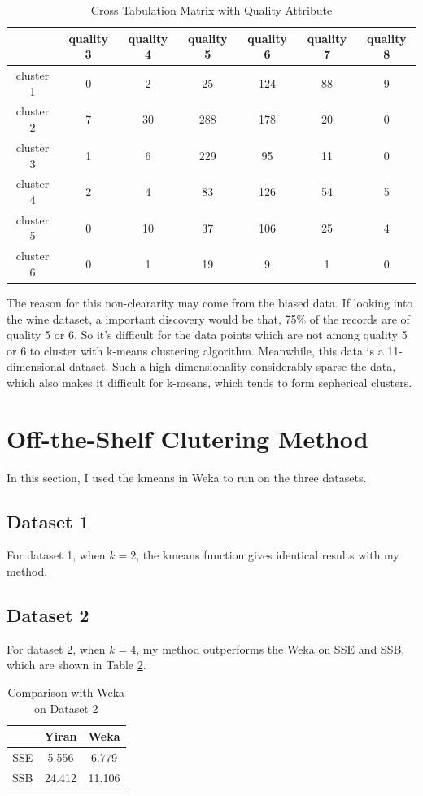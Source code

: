 \documentclass{article}
\begin{document}
		\begin{table}
		\centering
			\begin{tabular}{|c|c|c|c|c|c|c|}
			\hline
			&	quality 3&	quality 4	&quality 5	&quality 6&	quality 7&	quality 8\\
			\hline
			cluster 1&	0&	2	&25	&124	&88&	9\\
			\hline
			cluster 2&	7&	30&	288	&178	&20&	0\\
			\hline
			cluster 3&	1&	6	&229 &	95	&11&	0\\
			\hline
			cluster 4&	2&	4	&83	&126	&54&	5\\
			\hline
			cluster 5&	0&	10&	37	&106	&25&	4\\
			\hline
			cluster 6&	0&	1	&19	&9&	1&	0 \\
			\hline
			\end{tabular}
			\caption{Cross Tabulation Matrix with Quality Attribute}
			\label{tbl:wine-cross}
		\end{table}

		The reason for this non-cleararity may come from the biased data. If looking into the wine dataset, a important discovery would be that, 75\% of the records are of quality 5 or 6. So it's difficult for the data points which are not among quality 5 or 6 to cluster with k-means clustering algorithm. Meanwhile, this data is a 11-dimensional dataset. Such a high dimensionality considerably sparse the data, which also makes it difficult for k-means, which tends to form sepherical clusters.

\section{Off-the-Shelf Clutering Method}
	In this section, I used the kmeans in Weka to run on the three datasets. 
	\subsection{Dataset 1}
		For dataset 1, when $k=2$, the kmeans function gives identical results with my method.
	\subsection{Dataset 2}
		For dataset 2, when $k=4$, my method outperforms the Weka on SSE and SSB, which are shown in Table \ref{tbl:off-shelf-2}.
		\begin{table}[H]
		\centering
			\begin{tabular}{|c|c|c|}
				\hline
				& Yiran & Weka \\
				\hline
				SSE & 5.556 & 6.779 \\
				\hline
				SSB & 24.412 & 11.106 \\
				\hline
			\end{tabular}
			\caption{Comparison with Weka on Dataset 2}
			\label{tbl:off-shelf-2}
		\end{table}
\end{document}
